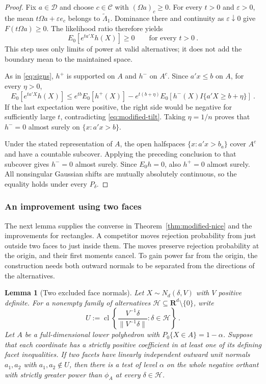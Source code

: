 \documentclass[11pt]{article}
\newcommand{\red}[1]{{\color{red}#1}} %
\numberwithin{equation}{section}
\newtheorem{lemma}{Lemma}
\theoremstyle{definition}
\begin{document}
{\begin{proof}
Fix $a\in\mathcal D$ and choose $c\in\mathcal C$ with $(\Omega a)_c\ge0$. For every $t>0$ and $\varepsilon>0$, the mean $t\Omega a+\varepsilon e_c$ belongs to $\widetilde\Lambda_1$. Dominance there and continuity as $\varepsilon\downarrow0$ give $F(t\Omega a)\ge0$. The likelihood ratio therefore yields
\begin{equation}\label{eq:modified-tilt}
E_0[e^{ta'X}h(X)]\ge0\qquad\text{for every }t>0~.
\end{equation}
This step uses only limits of power at valid alternatives; it does not add the boundary mean to the maintained space.

As in \eqref{eq:signs}, $h^+$ is supported on $A$ and $h^-$ on $A^c$. Since $a'x\le b$ on $A$, for every $\eta>0$,
\[
E_0[e^{ta'X}h(X)]
\le e^{tb}E_0[h^+(X)]
-e^{t(b+\eta)}E_0[h^-(X)I\{a'X\ge b+\eta\}]~.
\]
If the last expectation were positive, the right side would be negative for sufficiently large $t$, contradicting \eqref{eq:modified-tilt}. Taking $\eta=1/n$ proves that $h^-=0$ almost surely on $\{x:a'x>b\}$.

Under the stated representation of $A$, the open halfspaces $\{x:a'x>b_a\}$ cover $A^c$ and have a countable subcover. Applying the preceding conclusion to that subcover gives $h^-=0$ almost surely. Since $E_0h=0$, also $h^+=0$ almost surely. All nonsingular Gaussian shifts are mutually absolutely continuous, so the equality holds under every $P_\delta$.
\end{proof}

\red{%
\subsubsection*{An improvement using two faces}

The next lemma supplies the converse in Theorem~\ref{thm:modified-nice} and the improvements for rectangles. A competitor moves rejection probability from just outside two faces to just inside them. The moves preserve rejection probability at the origin, and their first moments cancel. To gain power far from the origin, the construction needs both outward normals to be separated from the directions of the alternatives.

\begin{lemma}[Two excluded face normals]\label{lem:two-excluded-faces}
Let $X\sim N_d(\delta,V)$ with $V$ positive definite. For a nonempty family of alternatives $\mathcal H\subseteq\mathbf R^d\setminus\{0\}$, write
\[
 U:=\operatorname{cl}\left\{\frac{V^{-1}\delta}{\|V^{-1}\delta\|}:\delta\in\mathcal H\right\}~.
\]
Let $A$ be a full-dimensional lower polyhedron with $P_0\{X\in A\}=1-\alpha$. Suppose that each coordinate has a strictly positive coefficient in at least one of its defining facet inequalities. If two facets have linearly independent outward unit normals $a_1,a_2$ with $a_1,a_2\notin U$, then there is a test of level $\alpha$ on the whole negative orthant with strictly greater power than $\phi_A$ at every $\delta\in\mathcal H$.
\end{lemma}

}}
\end{document}
